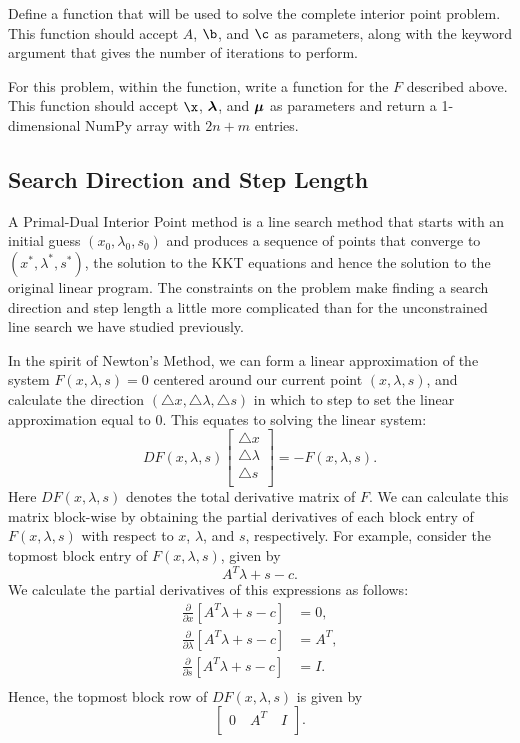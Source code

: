\begin{problem} %
Define a function  that will be used to solve the complete interior point problem.
This function should accept $A$, $\b$, and $\c$ as parameters, along with the keyword argument  that gives the number of iterations to perform.

For this problem, within the  function, write a function for the $F$ described above.
This function should accept $\x$, $\boldsymbol{\lambda}$, and $\boldsymbol{\mu}$ as parameters and return a 1-dimensional NumPy array with $2n+m$ entries.
\end{problem}

\subsection*{Search Direction and Step Length}

A Primal-Dual Interior Point method is a line search method that starts with an initial guess $(x_0, \lambda_0, s_0)$ and produces a sequence of points that converge to $(x^*, \lambda^*, s^*)$, the solution to the KKT equations and hence the solution to the original linear program.
The constraints on the problem make finding a search direction and step length a little more complicated than for the unconstrained line search we have studied previously.

In the spirit of Newton's Method, we can form a linear approximation of the system $F(x,\lambda,s) = 0$ centered around our current point $(x, \lambda, s)$, and calculate the direction $(\triangle x, \triangle \lambda, \triangle s)$ in which to step to set the linear approximation equal to 0.
This equates to solving the linear system:
\[
DF(x,\lambda,s)
\begin{bmatrix}
\triangle x\\
\triangle \lambda\\
\triangle s\\
\end{bmatrix}
= - F(x,\lambda,s).
\]
Here $DF(x,\lambda,s)$ denotes the total derivative matrix of $F$.
We can calculate this matrix block-wise by obtaining the partial derivatives of each block entry of $F(x,\lambda, s)$ with respect to $x$, $\lambda$, and $s$, respectively.
For example, consider the topmost block entry of $F(x,\lambda,s)$, given by
\[
A^T\lambda + s - c.
\]
We calculate the partial derivatives of this expressions as follows:
\begin{align*}
\frac{\partial}{\partial x}[A^T\lambda + s - c] &= 0,\\
\frac{\partial}{\partial \lambda}[A^T\lambda + s - c] &= A^T,\\
\frac{\partial}{\partial s}[A^T\lambda + s - c] &= I.\\
\end{align*}
Hence, the topmost block row of $DF(x,\lambda,s)$ is given by
\[
\begin{bmatrix}
0 \quad A^T \quad I\\
\end{bmatrix}.
\]


